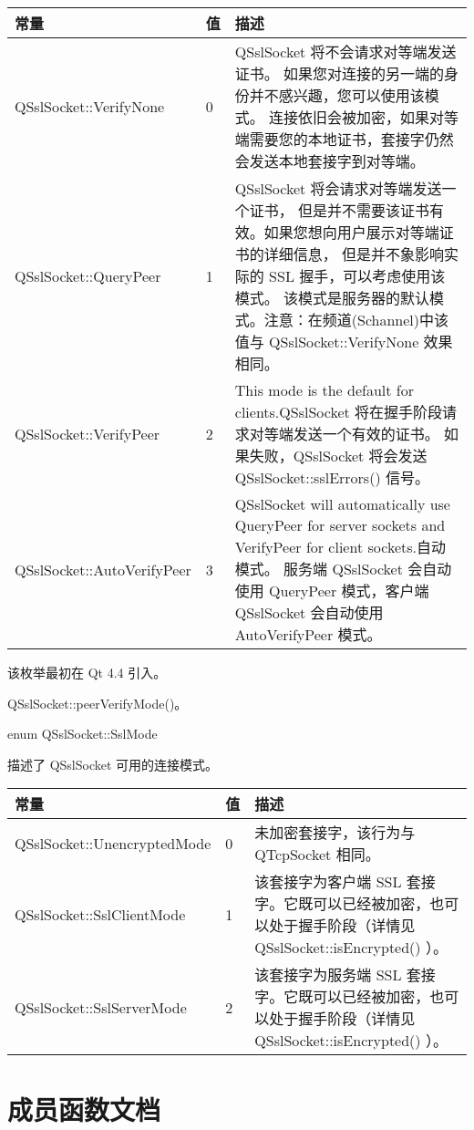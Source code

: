 \begin{tabular}[l]{|l|l|m{28em}|}
	\hline 
	常量 	& 值  &	描述 \\
	\hline
	QSslSocket::VerifyNone &	0 &	QSslSocket 将不会请求对等端发送证书。
	  如果您对连接的另一端的身份并不感兴趣，您可以使用该模式。
	  连接依旧会被加密，如果对等端需要您的本地证书，套接字仍然会发送本地套接字到对等端。 \\ 
	\hline
	QSslSocket::QueryPeer& 	1 	&QSslSocket 将会请求对等端发送一个证书，
	但是并不需要该证书有效。如果您想向用户展示对等端证书的详细信息，
	但是并不象影响实际的 SSL 握手，可以考虑使用该模式。
	该模式是服务器的默认模式。注意：在频道(Schannel)中该值与 QSslSocket::VerifyNone 效果相同。 \\
	\hline
	QSslSocket::VerifyPeer &	2 &	This mode is the default for clients.QSslSocket 将在握手阶段请求对等端发送一个有效的证书。
	如果失败，QSslSocket 将会发送 QSslSocket::sslErrors() 信号。 \\ 
	\hline
	QSslSocket::AutoVerifyPeer 	&3 &	QSslSocket will automatically use QueryPeer for server sockets and VerifyPeer for client sockets.自动模式。
	服务端 QSslSocket 会自动使用 QueryPeer 模式，客户端 QSslSocket 会自动使用 AutoVerifyPeer 模式。 \\ 
	\hline
\end{tabular}


该枚举最初在 Qt 4.4 引入。

\begin{seeAlso}
QSslSocket::peerVerifyMode()。
\end{seeAlso}

enum QSslSocket::SslMode

描述了 QSslSocket 可用的连接模式。


\begin{tabular}[l]{|l|l|m{28em}|}
	\hline 
	常量 	& 值  &	描述 \\
	\hline
QSslSocket::UnencryptedMode  &	0 &	未加密套接字，该行为与 QTcpSocket 相同。 \\ 
\hline
QSslSocket::SslClientMode &	1 	&该套接字为客户端 SSL 套接字。它既可以已经被加密，也可以处于握手阶段（详情见 QSslSocket::isEncrypted() ）。 \\ 
\hline
QSslSocket::SslServerMode &	2 	&该套接字为服务端 SSL 套接字。它既可以已经被加密，也可以处于握手阶段（详情见 QSslSocket::isEncrypted() ）。 \\ 
	\hline
\end{tabular}

\section{成员函数文档}


